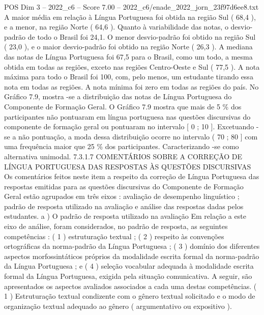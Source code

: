 \begin{textsample}{POS Dim 3 – 2022\_c6 – Score 7.00 – 2022\_c6/enade\_2022\_jorn\_23f97d6ee8.txt}
A maior média em relação à Língua Portuguesa foi obtida na região Sul ( 68,4 ), e a menor, na região Norte ( 64,6 ).
Quanto à variabilidade das notas, o desvio-padrão de todo o Brasil foi 24,1.
O menor desvio-padrão foi obtido na região Sul ( 23,0 ), e o maior desvio-padrão foi obtido na região Norte ( 26,3 ).
A mediana das notas de Língua Portuguesa foi 67,5 para o Brasil, como um todo, a mesma obtida em todas as regiões, exceto nas regiões Centro-Oeste e Sul ( 77,5 ).
A nota máxima para todo o Brasil foi 100, com, pelo menos, um estudante tirando essa nota em todas as regiões.
A nota mínima foi zero em todas as regiões do país.
No Gráfico 7.9, mostra -se a distribuição das notas de Língua Portuguesa do Componente de Formação Geral.
O Gráfico 7.9 mostra que mais de 5 \% dos participantes não pontuaram em língua portuguesa nas questões discursivas do componente de formação geral ou pontuaram no intervalo [ 0 ; 10 ].
Excetuando -se a não pontuação, a moda dessa distribuição ocorre no intervalo ( 70 ; 80 ] com uma frequência maior que 25 \% dos participantes.
Caracterizando -se como alternativa unimodal. 7.3.1.7 COMENTÁRIOS SOBRE A CORREÇÃO DE LÍNGUA PORTUGUESA DAS RESPOSTAS ÀS QUESTÕES DISCURSIVAS Os comentários feitos neste item a respeito da correção de Língua Portuguesa das respostas emitidas para as questões discursivas do Componente de Formação Geral estão agrupados em três eixos : avaliação de desempenho linguístico ; padrão de resposta utilizado na avaliação e análise das respostas dadas pelos estudantes. a ) O padrão de resposta utilizado na avaliação Em relação a este eixo de análise, foram considerados, no padrão de resposta, as seguintes competências : ( 1 ) estruturação textual ; ( 2 ) respeito às convenções ortográficas da norma-padrão da Língua Portuguesa ; ( 3 ) domínio dos diferentes aspectos morfossintáticos próprios da modalidade escrita formal da norma-padrão da Língua Portuguesa ; e ( 4 ) seleção vocabular adequada à modalidade escrita formal da Língua Portuguesa, exigida pela situação comunicativa.
A seguir, são apresentados os aspectos avaliados associados a cada uma destas competências. ( 1 ) Estruturação textual condizente com o gênero textual solicitado e o modo de organização textual adequado ao gênero ( argumentativo ou expositivo ).

\end{textsample}

